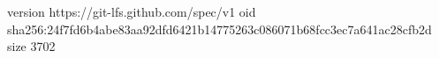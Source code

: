 version https://git-lfs.github.com/spec/v1
oid sha256:24f7fd6b4abe83aa92dfd6421b14775263c086071b68fcc3ec7a641ac28cfb2d
size 3702
